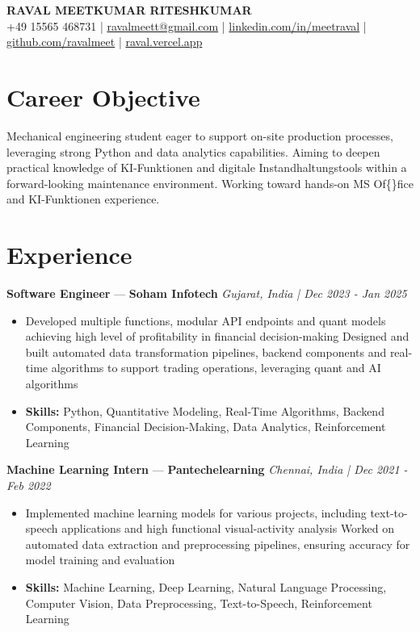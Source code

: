 \documentclass[a4paper,10pt]{article}
\begin{document}
\begin{center}
  {\Large\bfseries RAVAL MEETKUMAR RITESHKUMAR}\\[2pt]
  {\small +49 15565 468731 \;|\; \href{mailto:ravalmeett@gmail.com}{ravalmeett@gmail.com} \;|\; \href{https://www.linkedin.com/in/meetraval/}{linkedin.com/in/meetraval} \;|\; \href{https://github.com/ravalmeet}{github.com/ravalmeet} \;|\; \href{https://raval.vercel.app/}{raval.vercel.app}}
\end{center}
\vspace{-3pt}

\section*{Career Objective}
Mechanical engineering student eager to support on-site production processes, leveraging strong Python and data analytics capabilities. Aiming to deepen practical knowledge of KI-Funktionen and digitale Instandhaltungstools within a forward-looking maintenance environment. Working toward hands-on MS Of\{\}fice and KI-Funktionen experience.\par

\section*{Experience}
\textbf{Software Engineer} — \textbf{Soham Infotech} \hfill \textit{Gujarat, India \;|\; Dec 2023 - Jan 2025}\par
\vspace{1pt}
\begin{itemize}
  \item Developed multiple functions, modular API endpoints and quant models achieving high level of profitability in financial decision-making Designed and built automated data transformation pipelines, backend components and real-time algorithms to support trading operations, leveraging quant and AI algorithms
  \item \textbf{Skills:} Python, Quantitative Modeling, Real-Time Algorithms, Backend Components, Financial Decision-Making, Data Analytics, Reinforcement Learning
\end{itemize}
\vspace{3pt}
\textbf{Machine Learning Intern} — \textbf{Pantechelearning} \hfill \textit{Chennai, India \;|\; Dec 2021 - Feb 2022}\par
\vspace{1pt}
\begin{itemize}
  \item Implemented machine learning models for various projects, including text-to-speech applications and high functional visual-activity analysis Worked on automated data extraction and preprocessing pipelines, ensuring accuracy for model training and evaluation
  \item \textbf{Skills:} Machine Learning, Deep Learning, Natural Language Processing, Computer Vision, Data Preprocessing, Text-to-Speech, Reinforcement Learning
\end{itemize}
\end{document}

